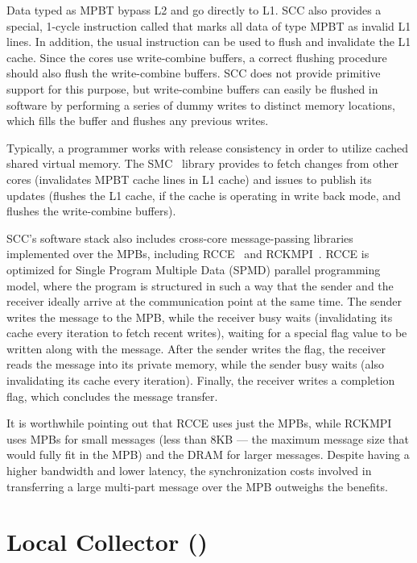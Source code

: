 Data typed as MPBT bypass L2 and go directly to L1. SCC also provides a
special, 1-cycle instruction called  that marks all data of type
MPBT as invalid L1 lines. In addition, the usual  instruction can be
used to flush and invalidate the L1 cache. Since the cores use write-combine
buffers, a correct flushing procedure should also flush the write-combine
buffers. SCC does not provide primitive support for this purpose, but
write-combine buffers can easily be flushed in software by performing a series
of dummy writes to distinct memory locations, which fills the buffer and
flushes any previous writes.

Typically, a programmer works with release consistency in order to utilize
cached shared virtual memory. The SMC~\cite{SMC} library provides
 to fetch changes from other cores (invalidates MPBT cache
lines in L1 cache) and issues  to publish its updates (flushes
the L1 cache, if the cache is operating in write back mode, and flushes the
write-combine buffers).

SCC's software stack also includes cross-core message-passing libraries
implemented over the MPBs, including RCCE~\cite{Mattson2010} and
RCKMPI~\cite{Urena2011}. RCCE is optimized for Single Program Multiple Data
(SPMD) parallel programming model, where the program is structured in such a
way that the sender and the receiver ideally arrive at the communication point
at the same time. The sender writes the message to the MPB, while the receiver
busy waits (invalidating its cache every iteration to fetch recent writes),
waiting for a special flag value to be written along with the message. After
the sender writes the flag, the receiver reads the message into its private
memory, while the sender busy waits (also invalidating its cache every
iteration). Finally, the receiver writes a completion flag, which concludes the
message transfer.

It is worthwhile pointing out that RCCE uses just the MPBs, while RCKMPI uses
MPBs for small messages (less than 8KB --- the maximum message size that would
fully fit in the MPB) and the DRAM for larger messages. Despite having a higher
bandwidth and lower latency, the synchronization costs involved in transferring
a large multi-part message over the MPB outweighs the benefits.

\section{Local Collector (\lc)}
\label{sec:lc}


